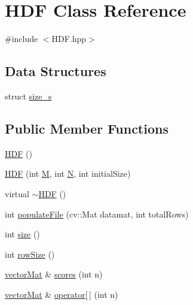 \hypertarget{classHDF}{\section{H\-D\-F Class Reference}
\label{classHDF}
}


{\ttfamily \#include $<$H\-D\-F.\-hpp$>$}

\subsection*{Data Structures}
\begin{DoxyCompactItemize}
\item 
struct \hyperlink{structHDF_1_1size__s}{size\-\_\-s}
\end{DoxyCompactItemize}
\subsection*{Public Member Functions}
\begin{DoxyCompactItemize}
\item 
\hyperlink{classHDF_a1e33708a192cf30a7bf826b5d53d42cd}{H\-D\-F} ()
\item 
\hyperlink{classHDF_a0f564af287f47d1761e1bd2aaf0bdf48}{H\-D\-F} (int \hyperlink{classHDF_aee1593ceda7b33a941e52e9f6e998f51}{M}, int \hyperlink{classHDF_ab3b5c9aa5d584ac3aa16ee9c6d04c340}{N}, int initial\-Size)
\item 
virtual \hyperlink{classHDF_ad204a0f509d106b76dac0cef51eba755}{$\sim$\-H\-D\-F} ()
\item 
int \hyperlink{classHDF_a89957a979d25bdc0c320a967698e01b3}{populate\-File} (cv\-::\-Mat datamat, int total\-Rows)
\item 
int \hyperlink{classHDF_a33415e3a4a7b17ab5530db3335b5c6f6}{size} ()
\item 
int \hyperlink{classHDF_a131cb3f6cc240a55a2bfa903c7eaff19}{row\-Size} ()
\item 
\hyperlink{types_8hpp_a3207a7addcfa415d1c83622febcb1e9b}{vector\-Mat} \& \hyperlink{classHDF_acac60e7d2930dead3a3ccb74bb762f6f}{scores} (int n)
\item 
\hyperlink{types_8hpp_a3207a7addcfa415d1c83622febcb1e9b}{vector\-Mat} \& \hyperlink{classHDF_a35b467f435cf7b954bcf83b729553f82}{operator\mbox{[}$\,$\mbox{]}} (int n)
\end{DoxyCompactItemize}

